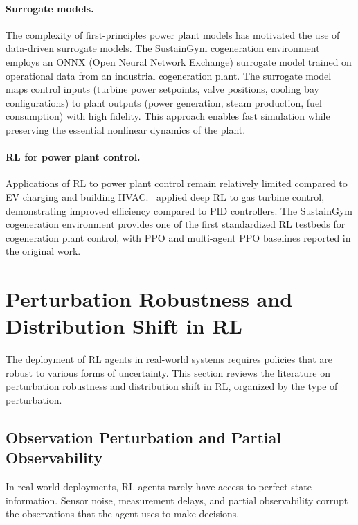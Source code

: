 \paragraph{Surrogate models.} The complexity of first-principles power plant models has motivated the use of data-driven surrogate models. The SustainGym cogeneration environment~\citep{yeh2023sustaingym} employs an ONNX (Open Neural Network Exchange) surrogate model trained on operational data from an industrial cogeneration plant. The surrogate model maps control inputs (turbine power setpoints, valve positions, cooling bay configurations) to plant outputs (power generation, steam production, fuel consumption) with high fidelity. This approach enables fast simulation while preserving the essential nonlinear dynamics of the plant.

\paragraph{RL for power plant control.} Applications of RL to power plant control remain relatively limited compared to EV charging and building HVAC.~\citet{vu2021gas_turbine} applied deep RL to gas turbine control, demonstrating improved efficiency compared to PID controllers. The SustainGym cogeneration environment provides one of the first standardized RL testbeds for cogeneration plant control, with PPO and multi-agent PPO baselines reported in the original work.

\section{Perturbation Robustness and Distribution Shift in RL}
\label{sec:lit_noise}

The deployment of RL agents in real-world systems requires policies that are robust to various forms of uncertainty. This section reviews the literature on perturbation robustness and distribution shift in RL, organized by the type of perturbation.

\subsection{Observation Perturbation and Partial Observability}

In real-world deployments, RL agents rarely have access to perfect state information. Sensor noise, measurement delays, and partial observability corrupt the observations that the agent uses to make decisions.

